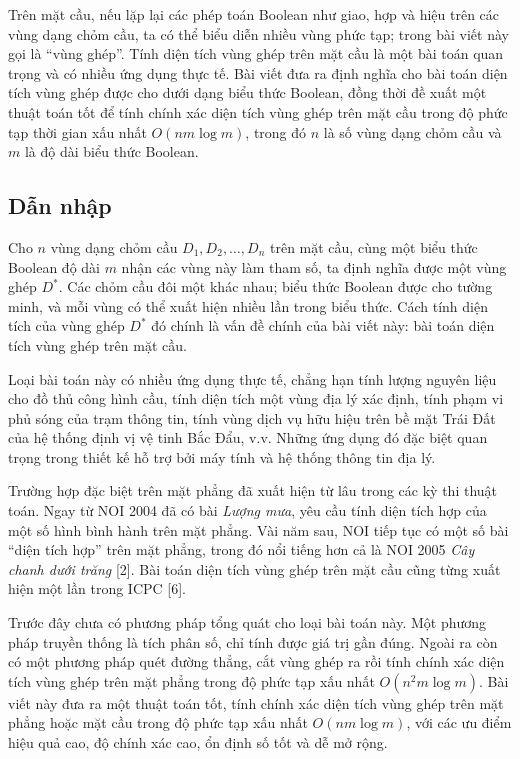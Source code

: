 \documentclass[11pt]{article}
\begin{document}
Trên mặt cầu, nếu lặp lại các phép toán Boolean như giao, hợp và hiệu trên các
vùng dạng chỏm cầu, ta có thể biểu diễn nhiều vùng phức tạp; trong bài viết
này gọi là ``vùng ghép''. Tính diện tích vùng ghép trên mặt cầu là một bài toán
quan trọng và có nhiều ứng dụng thực tế. Bài viết đưa ra định nghĩa cho bài
toán diện tích vùng ghép được cho dưới dạng biểu thức Boolean, đồng thời đề
xuất một thuật toán tốt để tính chính xác diện tích vùng ghép trên mặt cầu trong
độ phức tạp thời gian xấu nhất \(O(nm\log m)\), trong đó \(n\) là số vùng dạng
chỏm cầu và \(m\) là độ dài biểu thức Boolean.

\subsection{Dẫn nhập}

Cho \(n\) vùng dạng chỏm cầu \(D_1,D_2,\ldots,D_n\) trên mặt cầu, cùng một biểu
thức Boolean độ dài \(m\) nhận các vùng này làm tham số, ta định nghĩa được một
vùng ghép \(D^*\). Các chỏm cầu đôi một khác nhau; biểu thức Boolean được cho
tường minh, và mỗi vùng có thể xuất hiện nhiều lần trong biểu thức. Cách tính
diện tích của vùng ghép \(D^*\) đó chính là vấn đề chính của bài viết này: bài
toán diện tích vùng ghép trên mặt cầu.

Loại bài toán này có nhiều ứng dụng thực tế, chẳng hạn tính lượng nguyên liệu
cho đồ thủ công hình cầu, tính diện tích một vùng địa lý xác định, tính phạm vi
phủ sóng của trạm thông tin, tính vùng dịch vụ hữu hiệu trên bề mặt Trái Đất
của hệ thống định vị vệ tinh Bắc Đẩu, v.v. Những ứng dụng đó đặc biệt quan
trọng trong thiết kế hỗ trợ bởi máy tính và hệ thống thông tin địa lý.

Trường hợp đặc biệt trên mặt phẳng đã xuất hiện từ lâu trong các kỳ thi thuật
toán. Ngay từ NOI 2004 đã có bài \emph{Lượng mưa}, yêu cầu tính diện tích hợp
của một số hình bình hành trên mặt phẳng. Vài năm sau, NOI tiếp tục có một số
bài ``diện tích hợp'' trên mặt phẳng, trong đó nổi tiếng hơn cả là NOI 2005
\emph{Cây chanh dưới trăng} [2]. Bài toán diện tích vùng ghép trên mặt cầu cũng
từng xuất hiện một lần trong ICPC [6].

Trước đây chưa có phương pháp tổng quát cho loại bài toán này. Một phương pháp
truyền thống là tích phân số, chỉ tính được giá trị gần đúng. Ngoài ra còn có
một phương pháp quét đường thẳng, cắt vùng ghép ra rồi tính chính xác diện tích
vùng ghép trên mặt phẳng trong độ phức tạp xấu nhất \(O(n^2m\log m)\). Bài viết
này đưa ra một thuật toán tốt, tính chính xác diện tích vùng ghép trên mặt
phẳng hoặc mặt cầu trong độ phức tạp xấu nhất \(O(nm\log m)\), với các ưu điểm
hiệu quả cao, độ chính xác cao, ổn định số tốt và dễ mở rộng.
\end{document}
